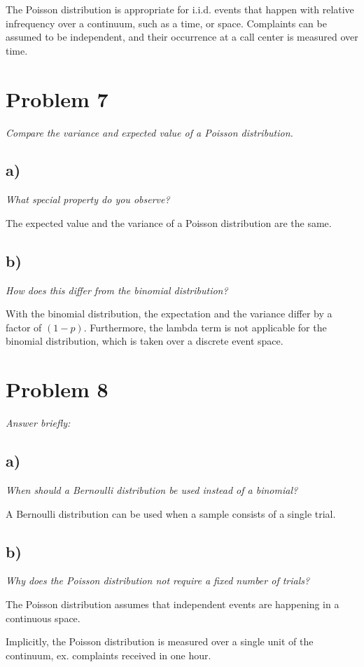 \documentclass[11pt, oneside]{article}   	%
\begin{document}
The Poisson distribution is appropriate for i.i.d. events that happen with relative infrequency over a continuum, such as a time, or space. Complaints can be assumed to be independent, and their occurrence at a call center is measured over time.

\section*{Problem 7}
\emph{Compare the variance and expected value of a Poisson distribution.}

\subsection{a)}
\emph{What special property do you observe?}

The expected value and the variance of a Poisson distribution are the same.

\subsection{b)}
\emph{How does this differ from the binomial distribution?}

With the binomial distribution, the expectation and the variance differ by a factor of $(1-p)$. Furthermore, the lambda term is not applicable for the binomial distribution, which is taken over a discrete event space. 

\section*{Problem 8}
\emph{Answer briefly:}

\subsection{a)}
\emph{When should a Bernoulli distribution be used instead of a binomial?}

A Bernoulli distribution can be used when a sample consists of a single trial.

\subsection{b)}
\emph{Why does the Poisson distribution not require a fixed number of trials?}

The Poisson distribution assumes that independent events are happening in a continuous space.

Implicitly, the Poisson distribution is measured over a single unit of the continuum, ex. complaints received in one hour.
\end{document}
